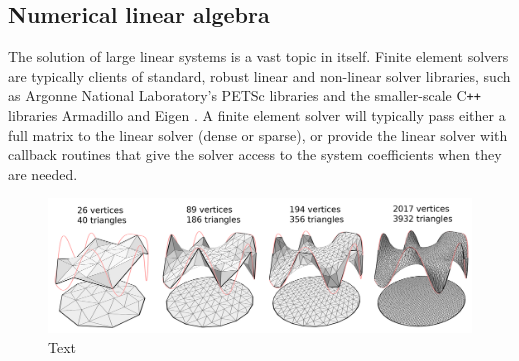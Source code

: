 
\subsection{Numerical linear algebra}
The solution of large linear systems is a vast topic in itself. Finite element solvers are typically clients
of standard, robust linear and non-linear solver libraries, such as Argonne National Laboratory's PETSc libraries \cite{petsc}
and the smaller-scale C\texttt{++} libraries Armadillo \cite{armadillo} and Eigen \cite{eigen}.
A finite element solver will typically pass either a full matrix to the linear solver (dense or sparse),
or provide the linear solver with callback routines that give the solver access to the system coefficients when they are needed.

\begin{figure}[H]
    \begin{center}
        \includegraphics[width=\linewidth]{figures/laplace/laplacev2.png}
    \end{center}
    \caption{\scriptsize
        Text
    }
    \label{laplace_solution}
\end{figure}


% 
% 
